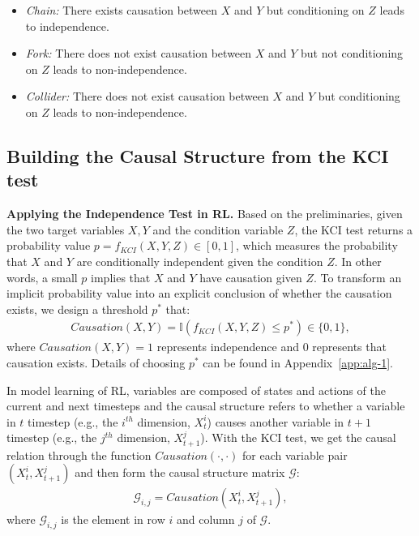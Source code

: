 \documentclass{article}
\theoremstyle{plain}
\theoremstyle{definition}
\theoremstyle{remark}
\begin{document}
\begin{itemize}[leftmargin=5mm]
    \item \textit{Chain:} There exists causation between $X$ and $Y$ but conditioning on $Z$ leads to independence.
    \item \textit{Fork:} There does not exist causation between $X$ and $Y$ but not conditioning on $Z$ leads to non-independence.
    \item \textit{Collider:} There does not exist causation between $X$ and $Y$ but conditioning on $Z$ leads to non-independence.
\end{itemize}




\subsection{Building the Causal Structure from the KCI test}

\textbf{Applying the Independence Test in RL.}
Based on the preliminaries, given the two target variables $X, Y$ and the condition variable $Z$, the KCI test returns a probability value $p=f_{KCI}(X, Y, Z)\in[0,1]$, which measures the probability that $X$ and $Y$ are conditionally independent given the condition $Z$.
In other words, a small $p$ implies that $X$ and $Y$ have causation given $Z$.
To transform an implicit probability value into an explicit conclusion of whether the causation exists, we design a threshold $p^*$ that:
\begin{align*}
    Causation(X,Y)=\mathbb{I}(f_{KCI}(X,Y,Z)\leq p^*)\in\{0,1\},
\end{align*}
where $Causation(X,Y)=1$ represents independence and $0$ represents that causation exists. 
Details of choosing $p^*$ can be found in Appendix~\ref{app:alg-1}.

In model learning of RL, variables are composed of states and actions of the current and next timesteps and the causal structure refers to whether a variable in $t$ timestep (e.g., the $i^{th}$ dimension, $X_t^i$) causes another variable in $t+1$ timestep (e.g., the $j^{th}$ dimension, $X_{t+1}^j$).
With the KCI test, we get the causal relation through the function $Causation(\cdot,\cdot)$ for each variable pair $(X_t^i,X_{t+1}^j)$ and then form the causal structure matrix $\mathcal{G}$:
\begin{align*}
    \mathcal{G}_{i,j}=Causation(X_t^i,X_{t+1}^j),
\end{align*}
where $\mathcal{G}_{i,j}$ is the element in row $i$ and column $j$ of $\mathcal{G}$.
\end{document}
